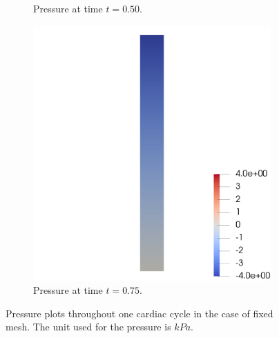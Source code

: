 \documentclass[a4paper,11pt,oneside]{book}
\begin{document}
\begin{figure}[h!]
\begin{subfigure}[b]{0.5\linewidth}
        \centering
    \caption{Pressure at time $t = 0.50$.} 
    \label{fig4:c} 
  \end{subfigure}%
  \begin{subfigure}[b]{0.5\linewidth}
    \centering
    \includegraphics[width=1.2\linewidth]{images/pressure_fixed_075.png} 
        \centering
    \caption{Pressure at time $t = 0.75$.} 
    \label{fig4:d} 
  \end{subfigure} 
  \centering
  \caption{Pressure plots throughout one cardiac cycle in the case of fixed mesh. The unit used for the pressure is $kPa$.}
  \label{fig4} 
\end{figure}


\newpage
\end{document}
